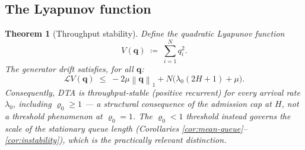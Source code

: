 \documentclass[11pt,a4paper]{article}
\newtheorem{theorem}{Theorem}[section]
\newcommand{\norm}[1]{\left\lVert #1 \right\rVert}
\newcommand{\rhozero}{\varrho_0}
\newcommand{\lambdazero}{\lambda_0}
\newcommand{\generator}{\mathcal{L}}
\begin{document}
\subsection{The Lyapunov function}

\begin{theorem}[Throughput stability]
\label{thm:lyapunov}
Define the quadratic Lyapunov function
\begin{equation}
  V(\mathbf{q}) \;\coloneqq\; \sum_{i=1}^N q_i^2.
  \label{eq:lyapunov}
\end{equation}
The generator drift satisfies, for all $\mathbf{q}$:
\begin{equation}
  \generator V(\mathbf{q})
  \;\leq\; -2\mu\norm{\mathbf{q}}_1 + N\bigl(\lambda_0(2H+1)+\mu\bigr).
  \label{eq:drift}
\end{equation}
Consequently, DTA is throughput-stable (positive recurrent) for
\emph{every} arrival rate $\lambdazero$, including $\rhozero \geq 1$ ---
a structural consequence of the admission cap at $H$, not a threshold
phenomenon at $\rhozero=1$. The $\rhozero<1$ threshold instead governs
the \emph{scale} of the stationary queue length (Corollaries
\ref{cor:mean-queue}--\ref{cor:instability}), which is the practically
relevant distinction.
\end{theorem}
\end{document}
